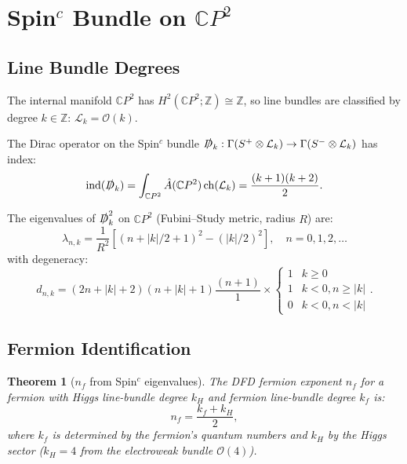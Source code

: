 \documentclass[11pt,a4paper]{article}
\newtheorem{theorem}{Theorem}[section]
\theoremstyle{remark}
\newcommand{\CP}{\mathbb{C}P}
\begin{document}
\section{Spin$^c$ Bundle on $\CP^2$}

\subsection{Line Bundle Degrees}

The internal manifold $\CP^2$ has $H^2(\CP^2; \mathbb{Z}) \cong \mathbb{Z}$,
so line bundles are classified by degree $k \in \mathbb{Z}$:
$\mathcal{L}_k = \mathcal{O}(k)$.

The Dirac operator on the Spin$^c$ bundle $\slashed{D}_k: \Gamma(S^+ \otimes \mathcal{L}_k) \to \Gamma(S^- \otimes \mathcal{L}_k)$
has index:
\begin{equation}
\mathrm{ind}(\slashed{D}_k) = \int_{\CP^2} \hat{A}(\CP^2)\,\mathrm{ch}(\mathcal{L}_k)
= \frac{(k+1)(k+2)}{2}.
\label{eq:index}
\end{equation}

The eigenvalues of $\slashed{D}_k^2$ on $\CP^2$ (Fubini--Study metric, radius $R$) are:
\begin{equation}
\lambda_{n,k} = \frac{1}{R^2}\left[(n + |k|/2 + 1)^2 - (|k|/2)^2\right],
\quad n = 0, 1, 2, \ldots
\label{eq:eigenvalues}
\end{equation}
with degeneracy:
\begin{equation}
d_{n,k} = (2n + |k| + 2)(n + |k| + 1)\frac{(n+1)}{1} \times \begin{cases}
1 & k \geq 0 \\
1 & k < 0, n \geq |k| \\
0 & k < 0, n < |k|
\end{cases}.
\end{equation}

\subsection{Fermion Identification}

\begin{theorem}[$n_f$ from Spin$^c$ eigenvalues]
\label{thm:nf}
The DFD fermion exponent $n_f$ for a fermion with Higgs line-bundle degree
$k_H$ and fermion line-bundle degree $k_f$ is:
\begin{equation}
n_f = \frac{k_f + k_H}{2},
\label{eq:nf-formula}
\end{equation}
where $k_f$ is determined by the fermion's quantum numbers and $k_H$
by the Higgs sector ($k_H = 4$ from the electroweak bundle $\mathcal{O}(4)$).
\end{theorem}
\end{document}
